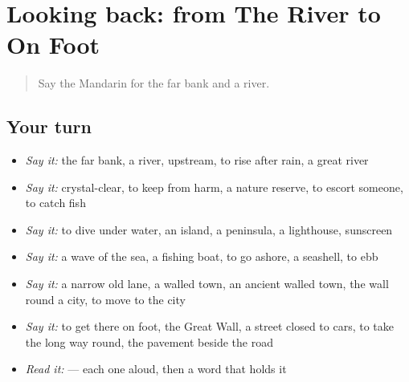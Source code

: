 \section[(dialogue)]{Looking back: from The River to On Foot}

\label{lesson:ZH-R447-review-442-447}



\begin{quote}
Say the Mandarin for the far bank and a river.
\end{quote}

\subsection*{Your turn}
\begin{itemize}
\raggedright
  \item \emph{Say it:} the far bank, a river, upstream, to rise after rain, a great river
  \item \emph{Say it:} crystal-clear, to keep from harm, a nature reserve, to escort someone, to catch fish
  \item \emph{Say it:} to dive under water, an island, a peninsula, a lighthouse, sunscreen
  \item \emph{Say it:} a wave of the sea, a fishing boat, to go ashore, a seashell, to ebb
  \item \emph{Say it:} a narrow old lane, a walled town, an ancient walled town, the wall round a city, to move to the city
  \item \emph{Say it:} to get there on foot, the Great Wall, a street closed to cars, to take the long way round, the pavement beside the road
  \item \emph{Read it:}     — each one aloud, then a word that holds it
\end{itemize}

